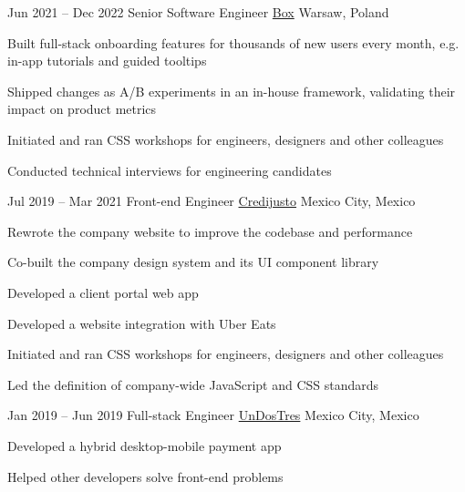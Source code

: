 \begin{sectionlist}
    \jobentry
        {Jun 2021 -- Dec 2022}
        {Senior Software Engineer}
        {\href{https://www.box.com}{Box}}
        {Warsaw, Poland}
        {
            \begin{jobentrylist}
                \item Built full-stack onboarding features for thousands of new
                    users every month, e.g. in-app tutorials and guided tooltips
                \item Shipped changes as A/B experiments in an in-house
                    framework, validating their impact on product metrics
                \item Initiated and ran CSS workshops for engineers, designers
                    and other colleagues
                \item Conducted technical interviews for engineering candidates
            \end{jobentrylist}
        }

    \jobentry
        {Jul 2019 -- Mar 2021}
        {Front-end Engineer}
        {\href{https://www.covalto.com}{Credijusto}}
        {Mexico City, Mexico}
        {
            \begin{jobentrylist}
                \item Rewrote the company website to improve the codebase and
                    performance
                \item Co-built the company design system and its UI component library
                \item Developed a client portal web app
                \item Developed a website integration with Uber Eats
                \item Initiated and ran CSS workshops for engineers, designers
                    and other colleagues
                \item Led the definition of company-wide JavaScript and CSS standards
            \end{jobentrylist}
        }

    \jobentry
        {Jan 2019 -- Jun 2019}
        {Full-stack Engineer}
        {\href{https://www.undostres.com.mx}{UnDosTres}}
        {Mexico City, Mexico}
        {
            \begin{jobentrylist}
                \item Developed a hybrid desktop-mobile payment app
                \item Helped other developers solve front-end problems
            \end{jobentrylist}
        }


\end{sectionlist}
